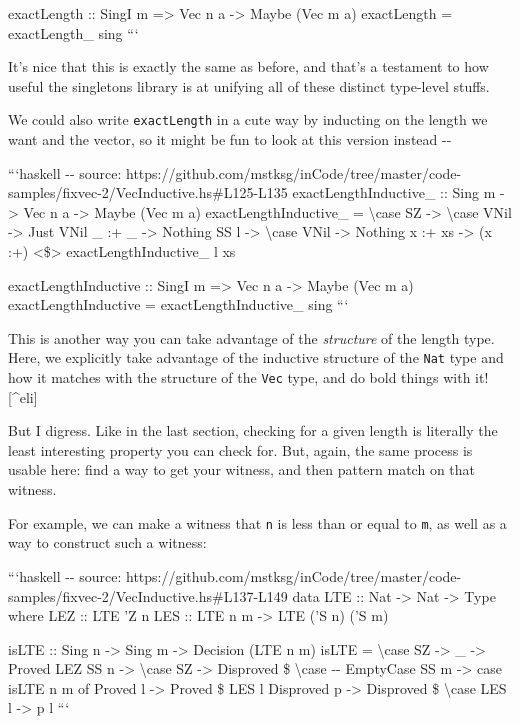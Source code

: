 \documentclass[]{article}
\begin{document}
exactLength :: SingI m =\textgreater{} Vec n a -\textgreater{} Maybe (Vec m a)
exactLength = exactLength\_ sing ```

It's nice that this is exactly the same as before, and that's a testament to how
useful the singletons library is at unifying all of these distinct type-level
stuffs.

We could also write \texttt{exactLength} in a cute way by inducting on the
length we want and the vector, so it might be fun to look at this version
instead -\/-

```haskell -\/- source:
https://github.com/mstksg/inCode/tree/master/code-samples/fixvec-2/VecInductive.hs\#L125-L135
exactLengthInductive\_ :: Sing m -\textgreater{} Vec n a -\textgreater{} Maybe
(Vec m a) exactLengthInductive\_ = \textbackslash{}case SZ -\textgreater{}
\textbackslash{}case VNil -\textgreater{} Just VNil \_ :+ \_ -\textgreater{}
Nothing SS l -\textgreater{} \textbackslash{}case VNil -\textgreater{} Nothing x
:+ xs -\textgreater{} (x :+) \textless{}\$\textgreater{} exactLengthInductive\_
l xs

exactLengthInductive :: SingI m =\textgreater{} Vec n a -\textgreater{} Maybe
(Vec m a) exactLengthInductive = exactLengthInductive\_ sing ```

This is another way you can take advantage of the \emph{structure} of the length
type. Here, we explicitly take advantage of the inductive structure of the
\texttt{Nat} type and how it matches with the structure of the \texttt{Vec}
type, and do bold things with it!{[}\^{}eli{]}

But I digress. Like in the last section, checking for a given length is
literally the least interesting property you can check for. But, again, the same
process is usable here: find a way to get your witness, and then pattern match
on that witness.

For example, we can make a witness that \texttt{n} is less than or equal to
\texttt{m}, as well as a way to construct such a witness:

```haskell -\/- source:
https://github.com/mstksg/inCode/tree/master/code-samples/fixvec-2/VecInductive.hs\#L137-L149
data LTE :: Nat -\textgreater{} Nat -\textgreater{} Type where LEZ :: LTE 'Z n
LES :: LTE n m -\textgreater{} LTE ('S n) ('S m)

isLTE :: Sing n -\textgreater{} Sing m -\textgreater{} Decision (LTE n m) isLTE
= \textbackslash{}case SZ -\textgreater{} \_ -\textgreater{} Proved LEZ SS n
-\textgreater{} \textbackslash{}case SZ -\textgreater{} Disproved \$
\textbackslash{}case -\/- EmptyCase SS m -\textgreater{} case isLTE n m of
Proved l -\textgreater{} Proved \$ LES l Disproved p -\textgreater{} Disproved
\$ \textbackslash{}case LES l -\textgreater{} p l ```
\end{document}
